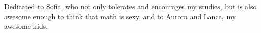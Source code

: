 %
%
\thispagestyle{empty}
{}

\vspace*{3cm}

%

\begin{center}
    Dedicated to Sofia,
    who not only tolerates and encourages my studies, but is also awesome enough to think that math is sexy, and
    to Aurora and Lance, my awesome kids.
\end{center}
